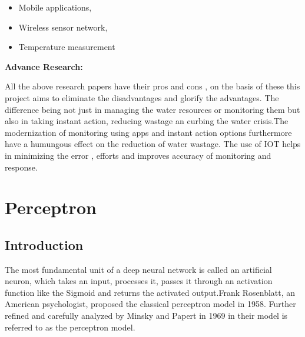 \documentclass[12pt,times,a4paper]{report}
\begin{document}
{{\begin{normalsize}
\begin{itemize}
\begin{itemize}
\item	Mobile applications,
\item	Wireless sensor network,
\item	Temperature measurement
\end{itemize}
\end{itemize}
\par
\textbf{Advance Research:}
\par
All the above research papers have their pros and cons , on the basis of these this project aims to eliminate the disadvantages and glorify the advantages. The difference being not just in managing the water resources or monitoring them but also in taking instant action, reducing wastage an curbing the water crisis.The modernization of monitoring using apps and instant action options furthermore have a humungous effect on the reduction of water wastage. The use of IOT helps in minimizing the error , efforts and improves accuracy of monitoring and response. 


\chapter{\fontsize{16}{14}\textbf{Perceptron\hfill}}

\section{Introduction}

\par
The most fundamental unit of a deep neural network is called an artificial neuron, which takes an input, processes it, passes it through an activation function like the Sigmoid and returns the activated output.Frank Rosenblatt, an American psychologist, proposed the classical perceptron model in 1958. Further refined and carefully analyzed by Minsky and Papert in 1969 in their model is referred to as the perceptron model.

\begin{figure}[H]
\begin{center}
\end{center}
\end{figure}


\end{normalsize}}}
\end{document}
